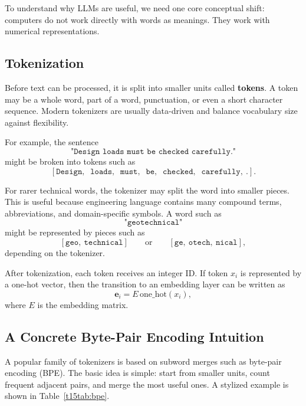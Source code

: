 \documentclass[12pt]{article}
\begin{document}
To understand why LLMs are useful, we need one core conceptual shift: computers do not work directly with words as meanings. They work with numerical representations.

\subsection{Tokenization}

Before text can be processed, it is split into smaller units called \textbf{tokens}. A token may be a whole word, part of a word, punctuation, or even a short character sequence. Modern tokenizers are usually data-driven and balance vocabulary size against flexibility.

For example, the sentence
\[
    \texttt{"Design loads must be checked carefully."}
\]
might be broken into tokens such as
\[
    [\texttt{Design},\ \texttt{ loads},\ \texttt{ must},\ \texttt{ be},\ \texttt{ checked},\ \texttt{ carefully},\ \texttt{.}].
\]

For rarer technical words, the tokenizer may split the word into smaller pieces. This is useful because engineering language contains many compound terms, abbreviations, and domain-specific symbols. A word such as
\[
    \texttt{"geotechnical"}
\]
might be represented by pieces such as
\[
    [\texttt{geo},\ \texttt{technical}] \qquad \text{or} \qquad [\texttt{ge},\ \texttt{otech},\ \texttt{nical}],
\]
depending on the tokenizer.

After tokenization, each token receives an integer ID. If token $x_i$ is represented by a one-hot vector, then the transition to an embedding layer can be written as
\begin{equation}
    \mathbf{e}_i = E\,\mathrm{one\_hot}(x_i),
    \label{t15eq:embedding_lookup}
\end{equation}
where $E$ is the embedding matrix.

\subsection{A Concrete Byte-Pair Encoding Intuition}

A popular family of tokenizers is based on subword merges such as byte-pair encoding (BPE). The basic idea is simple: start from smaller units, count frequent adjacent pairs, and merge the most useful ones. A stylized example is shown in Table~\ref{t15tab:bpe}.
\end{document}
